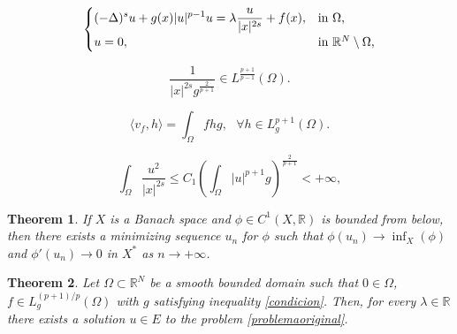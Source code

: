\documentclass[10pt,a4paper]{amsart}
\newtheorem{theorem}{Theorem}
\begin{document}
		\begin{equation}\label{problemaoriginal}
			\begin{cases}
				\displaystyle(-\Delta)^s u+ g(x)|u|^{p-1}u= \lambda \frac{u}{|x|^{2s}}+f(x), &  \text{in $\Omega$,}\\
				\mathnormal{u}=0, & \text{in $\mathbb{R}^N\setminus\Omega$,}
			\end{cases}
		\end{equation}

		\begin{equation}\label{condicion}
			\frac{1}{|x|^{2s}g^{\frac{2}{p+1}}}\in L^{\frac{p+1}{p-1}}(\Omega).
		\end{equation}

		\begin{equation}\label{DualE}
			\langle v_f, h
			\rangle = \int_{\Omega} fhg,\textit{ $\forall h\in L^{p+1}_g(\Omega)$.}
		\end{equation}

		\begin{equation}\label{acotacion}
			\int_\Omega \frac{u^2}{|x|^{2s}} \leq C_1\left(\int_{\Omega}|u|^{p+1}g\right)^{\frac{2}{p+1}}<+\infty,
		\end{equation}

		\begin{theorem}\label{ekeland}
			If $X$ is a Banach space and $\phi\in C^1(X,\mathbb{R})$ is bounded from below, then there exists a minimizing sequence $u_n$ for $\phi$ such that $\phi(u_n)\rightarrow \inf_X(\phi)$ and $\phi'(u_n)\rightarrow 0$ in $X^*$ as $n\rightarrow+\infty$.
		\end{theorem}

		\begin{theorem}\label{teo1}
			Let $\Omega\subset \mathbb{R}^N$ be a smooth bounded domain such that $0\in \Omega$,  $f \in L^{(p+1)/p}_g(\Omega)$ with $g$ satisfying  inequality \eqref{condicion}. Then, for every $\lambda\in \mathbb{R}$ there exists a solution $u\in E$ to the problem \eqref{problemaoriginal}. 
			
		\end{theorem}
\end{document}
